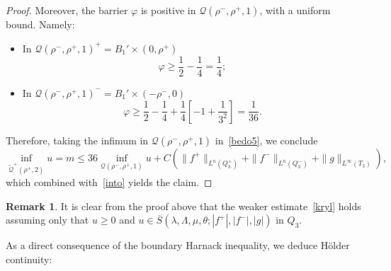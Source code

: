 \documentclass[letter,11pt]{amsart}
\newcommand{\gcal}{\mathcal{Q}}
\theoremstyle{definition}
\newtheorem{rem}[thm]{Remark}
\numberwithin{equation}{section}
\begin{document}
\begin{proof}
Moreover, the barrier $\varphi$ is positive in $\gcal(\rho^{-}, \rho^{+}, 1)$, with a uniform bound.
Namely:
\begin{itemize}
\item 
In $\gcal(\rho^{-}, \rho^{+}, 1)^{+}= B_1' \times (0, \rho^{+})$
\[
\varphi \geq \frac{1}{2} - \frac{1}{4} = \frac{1}{4};
\]
\item 
In $\gcal(\rho^{-}, \rho^{+}, 1)^{-}= B_1' \times (-\rho^{-}, 0)$
\[
\varphi \geq 
\frac{1}{2} - \frac{1}{4} + \frac{1}{4} \left[ - 1 + \frac{1}{3^2}\right]
= \frac{1}{36}.
\]
\end{itemize}
Therefore, taking the infimum in $\gcal(\rho^{-},\rho^{+},1)$ in~\eqref{bedo5}, we conclude
\begin{equation}
\label{kryl}
\inf_{\widetilde{\gcal}^{+}(\rho^{+},2)} u = m \leq 36 \inf_{\gcal(\rho^{-},\rho^{+},1)} u + C\left( 
\|f^{+}\|_{L^n(Q^{+}_3)} + \|f^{-}\|_{L^n(Q^{-}_3)}
+ \|g\|_{L^{\infty}(T_3)} \right),
\end{equation}
which combined with~\eqref{into} yields the claim.
\end{proof}
\begin{rem}
It is clear from the proof above that the weaker estimate~\eqref{kryl} holds assuming only that $u \geq 0$ and $u \in \overline{S}(\lambda,\Lambda,\mu,\theta; |f^{+}|, |f^{-}|, |g|)$ in $Q_3$.
\end{rem}

\medskip

As a direct consequence of the boundary Harnack inequality, we deduce H\"{o}lder continuity:
\end{document}
